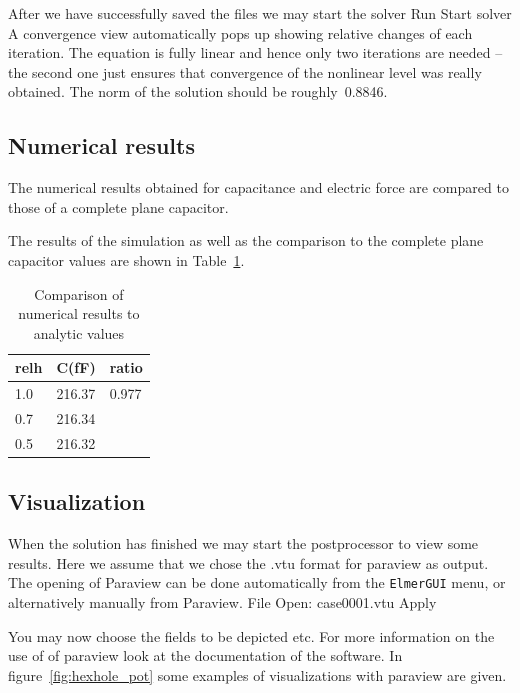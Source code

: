 After we have successfully saved the files we may start the solver
\ttbegin
Run
  Start solver
\ttend
A convergence view automatically pops up showing relative changes of each iteration.
The equation is fully linear and hence only two iterations are needed -- the second 
one just ensures that convergence of the nonlinear level was really obtained. 
The norm of the solution should be roughly~0.8846.


\subsection*{Numerical results}

The numerical results obtained for capacitance and electric force are compared
to those of a complete plane capacitor. 

The results of the simulation as well as the comparison to the
complete plane capacitor values are shown in Table~\ref{tab_elstatics}. 

\begin{table}[htb]
\caption{Comparison of numerical results to analytic values}
\label{tab_elstatics}
\begin{center}
\begin{tabular}{lll} \hline
relh & C(fF) & ratio \\ \hline
1.0  & 216.37    & 0.977       \\
0.7  & 216.34    &        \\
0.5  & 216.32    &        \\ \hline
\end{tabular}
\end{center}
\end{table}



\subsection*{Visualization}

When the solution has finished we may start the postprocessor to view some results.
Here we assume that we chose the .vtu format for paraview as output. The opening of Paraview can be done
automatically from the \texttt{ElmerGUI} menu, or alternatively manually from Paraview.
\ttbegin
File 
  Open: case0001.vtu
  Apply 
\ttend

You may now choose the fields to be depicted etc. For more information on the use of of paraview look at 
the documentation of the software. In figure~\ref{fig:hexhole_pot} some examples of visualizations with paraview are given. 


